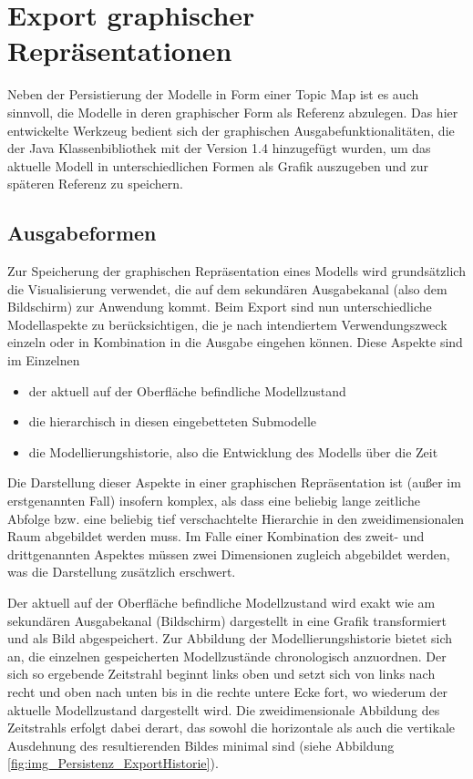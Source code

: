 \section{Export graphischer Repräsentationen} %
\label{sec:export_graphischer_repräsentationen}

Neben der Persistierung der Modelle in Form einer Topic Map ist es auch sinnvoll, die Modelle in deren graphischer Form als Referenz abzulegen. Das hier entwickelte Werkzeug bedient sich der graphischen Ausgabefunktionalitäten, die der Java Klassenbibliothek mit der Version 1.4 hinzugefügt wurden, um das aktuelle Modell in unterschiedlichen Formen als Grafik auszugeben und zur späteren Referenz zu speichern.

\subsection{Ausgabeformen} %
\label{sub:ausgabeformen}

Zur Speicherung der graphischen Repräsentation eines Modells wird grundsätzlich die Visualisierung verwendet, die auf dem sekundären Ausgabekanal (also dem Bildschirm) zur Anwendung kommt. Beim Export sind nun unterschiedliche Modellaspekte zu berücksichtigen, die je nach intendiertem Verwendungszweck einzeln oder in Kombination in die Ausgabe eingehen können. Diese Aspekte sind im Einzelnen
\begin{itemize}
	\item der aktuell auf der Oberfläche befindliche Modellzustand
	\item die hierarchisch in diesen eingebetteten Submodelle
	\item die Modellierungshistorie, also die Entwicklung des Modells über die Zeit
\end{itemize}

Die Darstellung dieser Aspekte in einer graphischen Repräsentation ist (außer im erstgenannten Fall) insofern komplex, als dass eine beliebig lange zeitliche Abfolge bzw. eine beliebig tief verschachtelte Hierarchie in den zweidimensionalen Raum abgebildet werden muss. Im Falle einer Kombination des zweit- und drittgenannten Aspektes müssen zwei Dimensionen zugleich abgebildet werden, was die Darstellung zusätzlich erschwert.

Der aktuell auf der Oberfläche befindliche Modellzustand wird exakt wie am sekundären Ausgabekanal (Bildschirm) dargestellt in eine Grafik transformiert und als Bild abgespeichert. Zur Abbildung der Modellierungshistorie bietet sich an, die einzelnen gespeicherten Modellzustände chronologisch anzuordnen. Der sich so ergebende Zeitstrahl beginnt links oben und setzt sich von links nach recht und oben nach unten bis in die rechte untere Ecke fort, wo wiederum der aktuelle Modellzustand dargestellt wird. Die zweidimensionale Abbildung des Zeitstrahls erfolgt dabei derart, das sowohl die horizontale als auch die vertikale Ausdehnung des resultierenden Bildes minimal sind (siehe Abbildung \ref{fig:img_Persistenz_ExportHistorie}).

